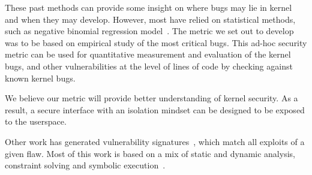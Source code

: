 These past methods can provide some insight on where bugs may lie in kernel and when
they may develop. However, most have relied on statistical methods, such as
negative binomial regression model~\cite{Bug-Location}. The metric we set out to
develop was to be based on empirical study of
the most critical bugs. This ad-hoc security metric can be used for
quantitative measurement and evaluation of the kernel bugs,
and other vulnerabilities at the level of lines of code by checking against
known kernel bugs.

We believe our metric will provide better understanding of kernel security.
As a result, a secure interface with an isolation mindset can be designed
to be exposed to the userspace.







Other work has generated vulnerability
signatures~\cite{brumley2006towards}, which match all exploits
of a given flaw. Most of this work is based on a mix of static and
dynamic analysis, constraint solving and symbolic execution~\cite{chou2003static}.


